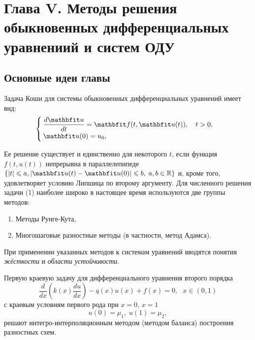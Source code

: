 \newpage
{}
\pagestyle{empty}
\vspace{0.5cm}

\section*{Глава V. Методы решения обыкновенных дифференциальных уравнениий и систем ОДУ}

\subsection{Основные идеи главы} 

Задача Коши для системы обыкновенных дифференциальных уравнений имеет вид:
\begin{equation}
%
    \label{Koshi_sys}
    \begin{cases}
        \dfrac{d\vfunc{u}}{dt} = \vfunc{f}(t, \vfunc{u}(t)), \quad t > 0, \\
        \vfunc{u}(0) = u_0,
    \end{cases}
\end{equation}

Ее решение существует и единственно для некоторого $t$, если функция $f(t, u(t))$ непрерывна в параллелепипеде $\{|t| \leqslant a, | \vfunc{u}(t)-\vfunc{u}(0)| \leqslant b,\; a, b\in\mathbb{R}\}$ и, кроме того, удовлетворяет условию Липшица по второму аргументу. Для численного решения задачи (1) наиболее широко в настоящее время используются две группы методов: 
\begin{enumerate}
\item Методы Рунге-Кута,
\item Многошаговые разностные методы (в частности, метод Адамса).
\end{enumerate}

При применении указанных методов к системам уравнений вводятся понятия \textit{жёсткости} и \textit{области устойчивости}.
 
Первую краевую задачу для дифференциального уравнения второго порядка
\begin{equation}
    \label{eq:2-ord-eq}
    \dfrac{d}{dx}\left(k(x)\dfrac{du}{dx}\right) - q(x)u(x) + f(x) = 0, ~~~x\in(0,1)
\end{equation}
%
с краевым условиям первого рода при $x=0$, $x=1$
%
\begin{equation}
    \label{eq:2-ord-eq-bounds}
    u(0) = \mu_1,\;u(1) = \mu_2,
\end{equation}
%
решают интегро-интерполяционным методом (методом баланса) построения разностных схем.

